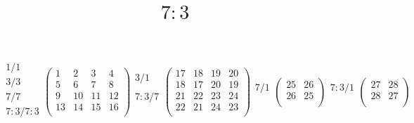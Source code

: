\documentclass[12pt,a4paper]{amsart}
\title{$7:3$}
\begin{document}
\maketitle


\begin{align*}
\begin{array}{r}%
1/1 \\%
3/3\\%
7/7\\%
7{:}3/7{:}3\\%
\end{array}%
\left(\begin{array}{r|r|r|r}%
1&2&3&4\\\hline%
5&6&7&8\\\hline%
9&10&11&12\\\hline%
13&14&15&16\\%
\end{array}\right)%
\begin{array}{r}%
3/1 \\%
\\%
7{:}3/7\\%
\\%
\end{array}%
\left(\begin{array}{rr|rr}%
17&18&19&20\\%
18&17&20&19\\\hline%
21&22&23&24\\%
22&21&24&23\\%
\end{array}\right)%
\begin{array}{r}%
7/1 \\%
\\%
\end{array}%
\left(\begin{array}{rr}%
25&26\\%
26&25\\%
\end{array}\right)%
\begin{array}{r}%
7{:}3/1\\%
\\%
\end{array}%
\left(\begin{array}{rr}%
27&28\\%
28&27\\%
\end{array}\right)%
\end{align*}
\end{document}
